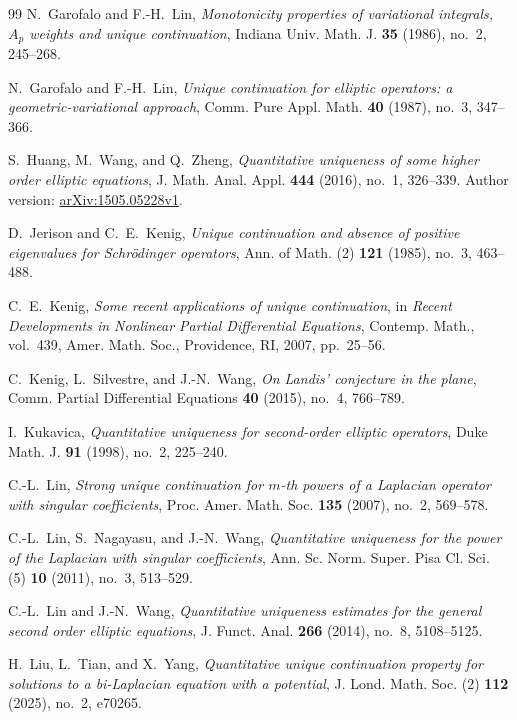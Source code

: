 \documentclass[11pt,a4paper,leqno]{amsart}
\numberwithin{equation}{section}
\theoremstyle{landisplain}
\theoremstyle{landisdefinition}
\theoremstyle{landisremark}
\begin{document}
\begin{thebibliography}{99}
N.~Garofalo and F.-H.~Lin,
\emph{Monotonicity properties of variational integrals, $A_p$ weights
and unique continuation},
Indiana Univ. Math. J. \textbf{35} (1986), no.~2, 245--268.

N.~Garofalo and F.-H.~Lin,
\emph{Unique continuation for elliptic operators: a
geometric-variational approach},
Comm. Pure Appl. Math. \textbf{40} (1987), no.~3, 347--366.

S.~Huang, M.~Wang, and Q.~Zheng,
\emph{Quantitative uniqueness of some higher order elliptic equations},
J. Math. Anal. Appl. \textbf{444} (2016), no.~1, 326--339.
Author version:
\href{https://arxiv.org/abs/1505.05228v1}{arXiv:1505.05228v1}.

D.~Jerison and C.~E.~Kenig,
\emph{Unique continuation and absence of positive eigenvalues for
Schr\"odinger operators},
Ann. of Math. (2) \textbf{121} (1985), no.~3, 463--488.

C.~E.~Kenig,
\emph{Some recent applications of unique continuation}, in
\emph{Recent Developments in Nonlinear Partial Differential Equations},
Contemp. Math., vol.~439, Amer. Math. Soc., Providence, RI, 2007,
pp.~25--56.

C.~Kenig, L.~Silvestre, and J.-N.~Wang,
\emph{On Landis' conjecture in the plane},
Comm. Partial Differential Equations \textbf{40} (2015), no.~4,
766--789.

I.~Kukavica,
\emph{Quantitative uniqueness for second-order elliptic operators},
Duke Math. J. \textbf{91} (1998), no.~2, 225--240.

C.-L.~Lin,
\emph{Strong unique continuation for $m$-th powers of a Laplacian
operator with singular coefficients},
Proc. Amer. Math. Soc. \textbf{135} (2007), no.~2, 569--578.

C.-L.~Lin, S.~Nagayasu, and J.-N.~Wang,
\emph{Quantitative uniqueness for the power of the Laplacian with
singular coefficients},
Ann. Sc. Norm. Super. Pisa Cl. Sci. (5) \textbf{10} (2011), no.~3,
513--529.

C.-L.~Lin and J.-N.~Wang,
\emph{Quantitative uniqueness estimates for the general second order
elliptic equations},
J. Funct. Anal. \textbf{266} (2014), no.~8, 5108--5125.

H.~Liu, L.~Tian, and X.~Yang,
\emph{Quantitative unique continuation property for solutions to a
bi-Laplacian equation with a potential},
J. Lond. Math. Soc. (2) \textbf{112} (2025), no.~2, e70265.


\end{thebibliography}
\end{document}
